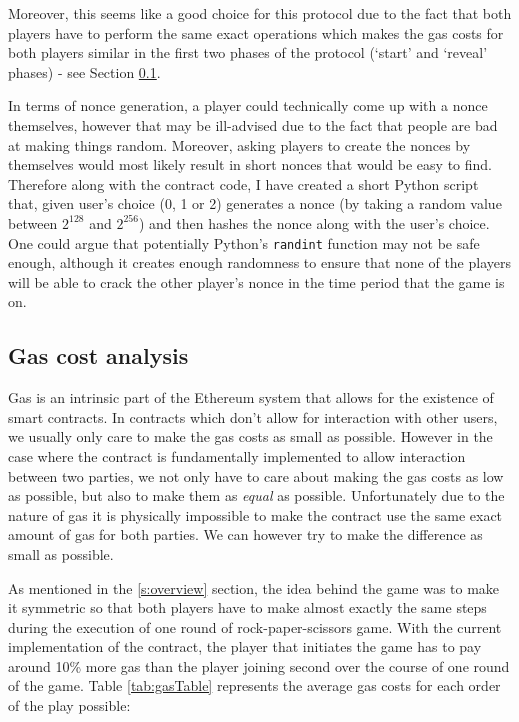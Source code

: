 \documentclass{article}
\begin{document}
    \noindent Moreover, this seems like a good choice for
    this protocol due to the fact that both players have to
    perform the same exact operations which makes the gas
    costs for both players similar in the first two phases
    of the protocol (`start' and `reveal' phases) - see
    Section \ref{s:gascost}.
    \newline

    \noindent In terms of nonce generation, a player could
    technically come up with a nonce themselves, however
    that may be ill-advised due to the fact that people are
    bad at making things random. Moreover, asking players to
    create the nonces by themselves would most likely result
    in short nonces that would be easy to find. Therefore
    along with the contract code, I have created a short
    Python script that, given user's choice (0, 1 or 2)
    generates a nonce (by taking a random value between
    \(2^{128}\) and \(2^{256}\)) and then hashes the nonce
    along with the user's choice. One could argue that
    potentially Python's \verb|randint| function may not be
    safe enough, although it creates enough randomness to
    ensure that none of the players will be able to crack
    the other player's nonce in the time period that the
    game is on.

    \subsection{Gas cost analysis} \label{s:gascost}
    Gas is an intrinsic part of the Ethereum system that
    allows for the existence of smart contracts. In
    contracts which don't allow for interaction with other
    users, we usually only care to make the gas costs as
    small as possible. However in the case where the
    contract is fundamentally implemented to allow
    interaction between two parties, we not only have to
    care about making the gas costs as low as possible, but
    also to make them as {\itshape equal} as possible.
    Unfortunately due to the nature of gas it is physically
    impossible to make the contract use the same exact
    amount of gas for both parties. We can however try to
    make the difference as small as possible.
    \newline

    \noindent As mentioned in the \ref{s:overview} section,
    the idea behind the game was to make it symmetric so
    that both players have to make almost exactly the same
    steps during the execution of one round of
    rock-paper-scissors game. With the current
    implementation of the contract, the player that
    initiates the game has to pay around 10\% more gas than
    the player joining second over the course of one round
    of the game. Table \ref{tab:gasTable} represents the
    average gas costs for each order of the play possible:
    \newline
\end{document}

